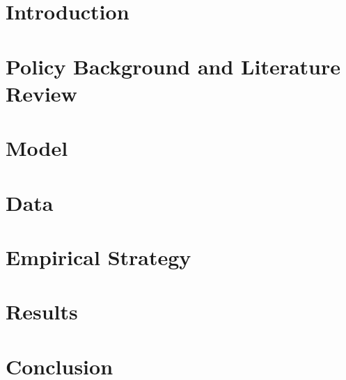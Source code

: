 \documentclass[12pt]{article}
\begin{document}
\doublespacing

\section{Introduction} \label{introduction}


\section{Policy Background and Literature Review} \label{policy_background}


\section{Model} \label{model}


\section{Data} \label{data}


\section{Empirical Strategy} \label{empirical_strategy}


\section{Results} \label{results}


\section{Conclusion} \label{conclusion}



\clearpage

\singlespacing





\newpage 

\end{document}
